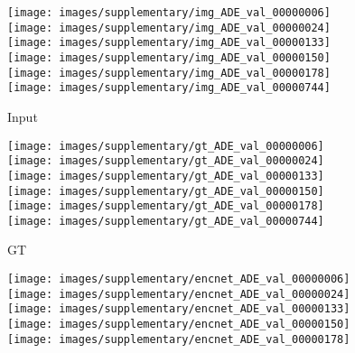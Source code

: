 \documentclass[10pt,twocolumn,letterpaper]{article}
\begin{document}
\begin{figure*}[!htb] 
\begin{center}
	\begin{subfigure}[b]{0.24\linewidth}
		\texttt{[image: images/supplementary/img\_ADE\_val\_00000006]}\\
		\texttt{[image: images/supplementary/img\_ADE\_val\_00000024]}\\
		\texttt{[image: images/supplementary/img\_ADE\_val\_00000133]}\\
		\texttt{[image: images/supplementary/img\_ADE\_val\_00000150]}\\
		\texttt{[image: images/supplementary/img\_ADE\_val\_00000178]}\\
		\texttt{[image: images/supplementary/img\_ADE\_val\_00000744]}\\
		\caption{Input}
    \end{subfigure}
    \hfill
	\begin{subfigure}[b]{0.24\linewidth}
		\texttt{[image: images/supplementary/gt\_ADE\_val\_00000006]}\\
		\texttt{[image: images/supplementary/gt\_ADE\_val\_00000024]}\\
		\texttt{[image: images/supplementary/gt\_ADE\_val\_00000133]}\\
		\texttt{[image: images/supplementary/gt\_ADE\_val\_00000150]}\\
		\texttt{[image: images/supplementary/gt\_ADE\_val\_00000178]}\\
		\texttt{[image: images/supplementary/gt\_ADE\_val\_00000744]}\\
		\caption{GT}
    \end{subfigure}
    \hfill
	\begin{subfigure}[b]{0.24\linewidth}
		\texttt{[image: images/supplementary/encnet\_ADE\_val\_00000006]}\\
		\texttt{[image: images/supplementary/encnet\_ADE\_val\_00000024]}\\
		\texttt{[image: images/supplementary/encnet\_ADE\_val\_00000133]}\\
		\texttt{[image: images/supplementary/encnet\_ADE\_val\_00000150]}\\
		\texttt{[image: images/supplementary/encnet\_ADE\_val\_00000178]}\\

\end{subfigure}
\end{center}
\end{figure*}
\end{document}
